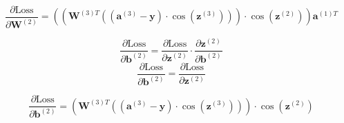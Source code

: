 \documentclass{ioereport}
\begin{document}
\begin{enumerate}[label=\textbf{\roman*.}]
  \begin{equation}
  \frac{\partial \text{Loss}}{\partial \mathbf{W}^{(2)}} = \left(\left(\mathbf{W}^{(3)T} \left((\mathbf{a}^{(3)} - \mathbf{y}) \cdot \cos(\mathbf{z}^{(3)})\right)\right) \cdot \cos(\mathbf{z}^{(2)})\right) \mathbf{a}^{(1)T}
  \end{equation}
 

   \[
  \frac{\partial \text{Loss}}{\partial \mathbf{b}^{(2)}} = \frac{\partial \text{Loss}}{\partial \mathbf{z}^{(2)}} \cdot \frac{\partial \mathbf{z}^{(2)}}{\partial \mathbf{b}^{(2)}}
  \]
  \[
  \frac{\partial \text{Loss}}{\partial \mathbf{b}^{(2)}} = \frac{\partial \text{Loss}}{\partial \mathbf{z}^{(2)}}
  \]

  \begin{equation}
  \frac{\partial \text{Loss}}{\partial \mathbf{b}^{(2)}} = \left(\mathbf{W}^{(3)T} \left((\mathbf{a}^{(3)} - \mathbf{y}) \cdot \cos(\mathbf{z}^{(3)})\right)\right) \cdot \cos(\mathbf{z}^{(2)})
  \end{equation}
\end{enumerate}
\end{document}
